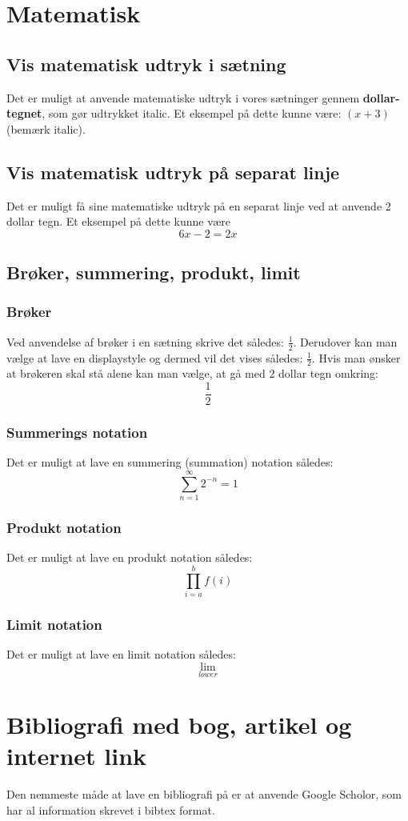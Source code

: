 \documentclass[11pt]{article}
\begin{document}
\section{Matematisk}

\subsection{Vis matematisk udtryk i sætning}
Det er muligt at anvende matematiske udtryk i vores sætninger gennem \textbf{dollar-tegnet}, som gør udtrykket italic. Et eksempel på dette kunne være: $(x+3)$ (bemærk italic). 
\subsection{Vis matematisk udtryk på separat linje}
Det er muligt få sine matematiske udtryk på en separat linje ved at anvende 2 dollar tegn. Et eksempel på dette kunne være $$6x - 2 = 2x$$
\subsection{Brøker, summering, produkt, limit}
\subsubsection{Brøker}
Ved anvendelse af brøker i en sætning skrive det således: \(\frac{1}{2}\). Derudover kan man vælge at lave en displaystyle og dermed vil det vises således: \( \displaystyle \frac{1}{2} \). Hvis man ønsker at brøkeren skal stå alene kan man vælge, at gå med 2 dollar tegn omkring: $$\frac{1}{2}$$
\subsubsection{Summerings notation}
Det er muligt at lave en summering (summation) notation således: $$\sum_{n=1}^{\infty} 2^{-n} = 1$$

\subsubsection{Produkt notation}
Det er muligt at lave en produkt notation således: $$\prod_{i=a}^{b} f(i)$$

\subsubsection{Limit notation}
Det er muligt at lave en limit notation således: $$\lim_{lower}$$

\section{Bibliografi med bog, artikel og internet link}
Den nemmeste måde at lave en bibliografi på er at anvende Google Scholor, som har al information skrevet i bibtex format.
\end{document}
